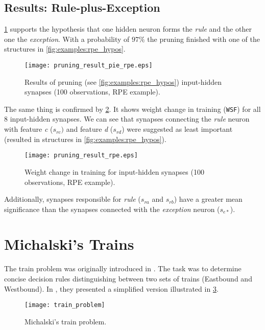 \subsection*{Results: Rule-plus-Exception}
\cref{fig:examples:pruning_result_pie_rpe} supports the hypothesis that one hidden neuron forms the \textit{rule} and the other one the \textit{exception}. With a probability of $ 97\% $ the pruning finished with one of the structures in \cref{fig:examples:rpe_hypos}.

\begin{figure}[H]
\centering
\texttt{[image: pruning\_result\_pie\_rpe.eps]}
\caption{Results of pruning (see \cref{fig:examples:rpe_hypos}) input-hidden synapses (100 observations, RPE example).}
\label{fig:examples:pruning_result_pie_rpe}
\end{figure}

The same thing is confirmed by \cref{fig:examples:pruning_result_rpe}. It shows weight change in training (\texttt{WSF}) for all 8 input-hidden synapses. We can see that synapses connecting the \textit{rule} neuron with feature \textit{c} ($ s_{rc}) $ and feature \textit{d} ($ s_{rd} $) were suggested as least important (resulted in structures in \cref{fig:examples:rpe_hypos}).

\begin{figure}[H]
\centering
\texttt{[image: pruning\_result\_rpe.eps]}
\caption{Weight change in training for input-hidden synapses (100 observations, RPE example).}
\label{fig:examples:pruning_result_rpe}
\end{figure}

Additionally, synapses responsible for \textit{rule} ($ s_{ra} $ and $ s_{rb} $) have a greater mean significance than the synapses connected with the \textit{exception} neuron ($ s_{e*} $).

\section{Michalski's Trains} \label{sec:example_trains}
The train problem was originally introduced in \citep{michalski:trains}. The task was to determine concise decision rules distinguishing between two sets of trains (Eastbound and Westbound). In \citep{mozer:skeletonization}, they presented a simplified version illustrated in \cref{fig:examples:dataset_train}.

\begin{figure}[H]
\centering
\texttt{[image: train\_problem]}
\caption{Michalski's train problem.}
\label{fig:examples:dataset_train}
\end{figure}


